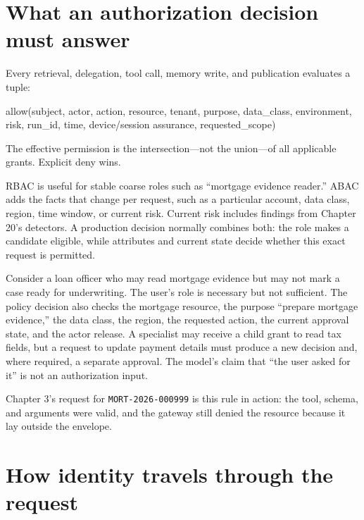 \section{What an authorization decision must answer}

Every retrieval, delegation, tool call, memory write, and publication evaluates a tuple:\par

allow(subject, actor, action, resource, tenant, purpose, data\_class, environment, risk, run\_id, time, device/session assurance, requested\_scope)\par

The effective permission is the intersection—not the union—of all applicable grants. Explicit deny wins.\par

RBAC is useful for stable coarse roles such as “mortgage evidence reader.” ABAC adds the facts that change per request, such as a particular account, data class, region, time window, or current risk. Current risk includes findings from Chapter 20's detectors. A production decision normally combines both: the role makes a candidate eligible, while attributes and current state decide whether this exact request is permitted.\par

Consider a loan officer who may read mortgage evidence but may not mark a case ready for underwriting. The user’s role is necessary but not sufficient. The policy decision also checks the mortgage resource, the purpose “prepare mortgage evidence,” the data class, the region, the requested action, the current approval state, and the actor release. A specialist may receive a child grant to read tax fields, but a request to update payment details must produce a new decision and, where required, a separate approval. The model’s claim that “the user asked for it” is not an authorization input.\par

Chapter 3's request for \lstinline[style=bookinline]!MORT-2026-000999! is this rule in action: the tool, schema, and arguments were valid, and the gateway still denied the resource because it lay outside the envelope.\par

\section{How identity travels through the request}


